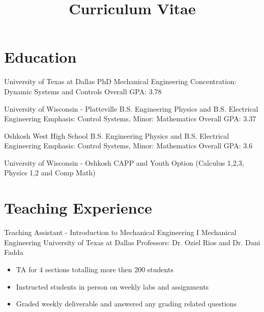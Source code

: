 \documentclass[11pt,letterpaper,roman]{moderncv} %
\title{Curriculum Vitae}
\begin{document}

\makecvtitle %

\vspace{- 0.5 cm}

\section{Education}

{University of Texas at Dallas}
{PhD Mechanical Engineering}{}
{Concentration: Dynamic Systems and Controls} 
{Overall GPA: 3.78}

{University of Wisconsin - Platteville}
{B.S. Engineering Physics and  B.S. Electrical Engineering}{}
{Emphasis: Control Systems, Minor: Mathematics} 
{Overall GPA: 3.37}

{Oshkosh West High School}
{B.S. Engineering Physics and  B.S. Electrical Engineering}{}
{Emphasis: Control Systems, Minor: Mathematics} 
{Overall GPA: 3.6}

{University of Wisconsin - Oshkosh}
{CAPP and Youth Option}
{(Calculus 1,2,3, Physics 1,2 and Comp Math)}{}{}


\section{Teaching Experience}

{Teaching Assistant - Introduction to Mechanical Engineering I}
{Mechanical Engineering}
{University of Texas at Dallas}
{Professors: Dr. Oziel Rios and Dr. Dani Fadda}
{\begin{itemize}
    \item TA for 4 sections totalling more then 200 students
    \item Instructed students in person on weekly labs and assignments
    \item Graded weekly deliverable and answered any grading related questions
\end{itemize}}
\end{document}
